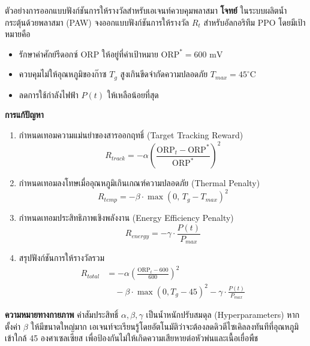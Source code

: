 \begin{examplebox}{ตัวอย่างการออกแบบฟังก์ชันการให้รางวัลสำหรับเอเจนท์ควบคุมพลาสมา}
\textbf{โจทย์} ในระบบผลิตน้ำกระตุ้นด้วยพลาสมา (PAW) จงออกแบบฟังก์ชันการให้รางวัล $R_t$ สำหรับอัลกอริทึม PPO โดยมีเป้าหมายคือ
\begin{itemize}
    \item รักษาค่าศักย์รีดอกซ์ $\text{ORP}$ ให้อยู่ที่ค่าเป้าหมาย $\text{ORP}^* = 600\text{ mV}$
    \item ควบคุมไม่ให้อุณหภูมิของก๊าซ $T_g$ สูงเกินขีดจำกัดความปลอดภัย $T_{max} = 45^\circ\text{C}$
    \item ลดการใช้กำลังไฟฟ้า $P(t)$ ให้เหลือน้อยที่สุด
\end{itemize}

\textbf{การแก้ปัญหา}
\begin{enumerate}
    \item กำหนดเทอมความแม่นยำของสารออกฤทธิ์ (Target Tracking Reward)
    \begin{equation*}
        R_{track} = -\alpha \left( \frac{\text{ORP}_t - \text{ORP}^*}{\text{ORP}^*} \right)^2
    \end{equation*}
    \item กำหนดเทอมลงโทษเมื่ออุณหภูมิเกินเกณฑ์ความปลอดภัย (Thermal Penalty)
    \begin{equation*}
        R_{temp} = -\beta \cdot \max\left( 0, \, T_g - T_{max} \right)^2
    \end{equation*}
    \item กำหนดเทอมประสิทธิภาพเชิงพลังงาน (Energy Efficiency Penalty)
    \begin{equation*}
        R_{energy} = -\gamma \cdot \frac{P(t)}{P_{max}}
    \end{equation*}
    \item สรุปฟังก์ชันการให้รางวัลรวม
    \begin{equation*}
    \begin{aligned}
        R_{total} &= -\alpha \left( \frac{\text{ORP}_t - 600}{600} \right)^2 \\
        &\quad - \beta \cdot \max(0, T_g - 45)^2 - \gamma \cdot \frac{P(t)}{P_{max}}
    \end{aligned}
    \end{equation*}
\end{enumerate}
\textbf{ความหมายทางกายภาพ} ค่าสัมประสิทธิ์ $\alpha, \beta, \gamma$ เป็นน้ำหนักปรับสมดุล (Hyperparameters) หากตั้งค่า $\beta$ ให้มีขนาดใหญ่มาก เอเจนท์จะเรียนรู้โดยอัตโนมัติว่าจะต้องลดดิวตีไซเคิลลงทันทีที่อุณหภูมิเข้าใกล้ 45 องศาเซลเซียส เพื่อป้องกันไม่ให้เกิดความเสียหายต่อหัวพ่นและเนื้อเยื่อพืช
\end{examplebox}

